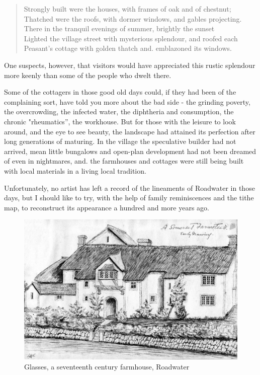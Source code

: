 \begin{quote}
Strongly built were the houses, with frames of oak and of chestnut; \\
Thatched were the roofs, with dormer windows, and gables projecting. \\
There in the tranquil evenings of summer, brightly the sunset \\
Lighted the village street with mysterious splendour, and roofed each  \\
Peasant’s cottage with golden thatch and. emblazoned its windows.
\end{quote}

One suspects, however, that visitors would have appreciated this rustic splendour more keenly than some of the people who dwelt there. 

Some of the cottagers in those good old days could, if they had been of the complaining sort, have told you more about the bad side - the grinding poverty, the overcrowding, the infected water, the diphtheria and consumption, the chronic "rheumatics”, the workhouse. But for those with the leisure to look around, and the eye to see beauty, the landscape had attained its perfection after long generations of maturing. In the village the speculative builder had not arrived, mean little bungalows and open-plan development had not been dreamed of even in nightmares, and. the farmhouses and cottages were still being built with local materials in a living local tradition.

Unfortunately, no artist has left a record of the lineaments of Roadwater in those days, but I should like to try, with the help of family reminiscences and the tithe map, to reconstruct its appearance a hundred and more years ago.

\begin{figure}[]
     \includegraphics[width=1\textwidth]{figures/Glasses}
     \caption{Glasses, a seventeenth century farmhouse, Roadwater}
     \label{fig:Glasses}
\end{figure}


